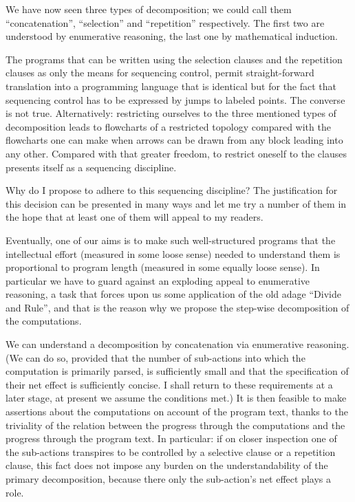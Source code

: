 We have now seen three types of decomposition; we could call them ``concatenation'', ``selection'' and ``repetition'' respectively. The first two are understood by enumerative reasoning, the last one by mathematical induction. 

The programs that can be written using the selection clauses and the repetition clauses as only the means for sequencing control, permit straight-forward translation into a programming language that is identical but for the fact that sequencing control has to be expressed by jumps to labeled points. The converse is not true. Alternatively: restricting ourselves to the three mentioned types of decomposition leads to flowcharts of a restricted topology compared with the flowcharts one can make when arrows can be drawn from any block leading into any other. Compared with that greater freedom, to restrict oneself to the clauses presents itself as a sequencing discipline.

Why do I propose to adhere to this sequencing discipline? The justification for this decision can be presented in many ways and let me try a number of them in the hope that at least one of them will appeal to my readers.

Eventually, one of our aims is to make such well-structured programs that the intellectual effort (measured in some loose sense) needed to understand them is proportional to program length (measured in some equally loose sense). In particular we have to guard against an exploding appeal to enumerative reasoning, a task that forces upon us some application of the old adage ``Divide and Rule'', and that is the reason why we propose the step-wise decomposition of the computations.

We can understand a decomposition by concatenation via enumerative reasoning. (We can do so, provided that the number of sub-actions into which the computation is primarily parsed, is sufficiently small and that the specification of their net effect is sufficiently concise. I shall return to these requirements at a later stage, at present we assume the conditions met.) It is then feasible to make assertions about the computations on account of the program text, thanks to the triviality of the relation between the progress through the computations and the progress through the program text. In particular: if on closer inspection one of the sub-actions transpires to be controlled by a selective clause or a repetition clause, this fact does not impose any burden on the understandability of the primary decomposition, because there only the sub-action's net effect plays a role.

